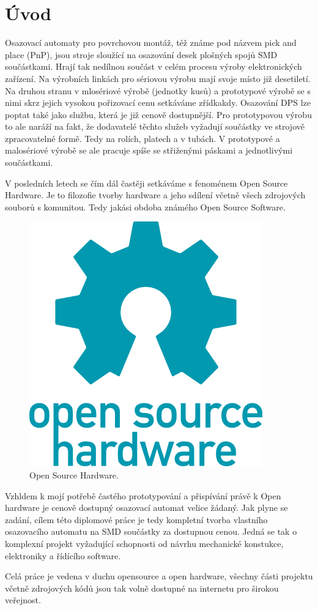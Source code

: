 \chapter*{Úvod}
{}


Osazovací automaty pro povrchovou montáž, též známe pod názvem pick and place (PnP), jsou stroje sloužící na osazování desek plošných spojů SMD součástkami. Hrají tak nedílnou součást v celém procesu výroby elektronických zařízení. 
Na výrobních linkách pro sériovou výrobu mají svoje místo již desetiletí. Na druhou stranu v mlosériové výrobě (jednotky kusů) a prototypové výrobě se s nimi skrz jejich vysokou pořizovací cenu setkáváme zřídkakdy.
Osazování DPS lze poptat také jako službu, která je již cenově dostupnější. Pro prototypovou výrobu to ale naráží na fakt, že dodavatelé těchto služeb vyžadují součástky ve strojově zpracovatelné formě. Tedy na rolích, platech a v tubách. V prototypové a malosériové výrobě se ale pracuje spíše se střiženými  páskami a jednotlivými součástkami.


V posledních letech se čím dál častěji setkáváme s fenoménem Open Source Hardware. Je to filozofie tvorby hardware a jeho sdílení včetně všech zdrojových souborů s komunitou. Tedy jakási obdoba známého Open Source Software.

\begin{figure}[h!]

  \centering
    \includegraphics[width=0.4\linewidth]{obrazky/openhw.png}%
    \caption{Open Source Hardware.}
\end{figure}

Vzhldem k mojí potřebě častého prototypování a přispívání právě k Open hardware je cenově dostupný osazovací automat velice žádaný. Jak plyne se zadání, cílem této diplomové práce je tedy kompletní tvorba vlastního osazovacího automatu na SMD součástky za dostupnou cenou. Jedná se tak o komplexní projekt vyžadující schopnosti od návrhu mechanické konstukce, elektroniky a řídícího software.

 Celá práce je vedena v duchu opensource a open hardware, všechny části projektu včetně zdrojových kódů jsou tak volně dostupné na internetu pro širokou veřejnost.
